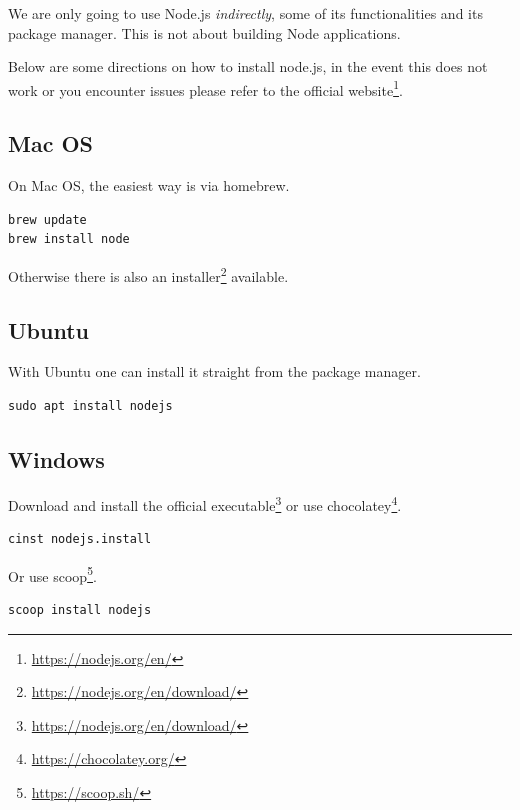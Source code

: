 \documentclass[
  10pt,
]{krantz}
\makeatletter
\renewcommand{\href}[2]{#2\footnote{\url{#1}}}
\newenvironment{kframe}{%
\medskip{}
\setlength{\fboxsep}{.8em}
 \def\at@end@of@kframe{}%
 \ifinner\ifhmode%
  \def\at@end@of@kframe{\end{minipage}}%
  \begin{minipage}{\columnwidth}%
 \fi\fi%
 \def\FrameCommand##1{\hskip\@totalleftmargin \hskip-\fboxsep
 \colorbox{shadecolor}{##1}\hskip-\fboxsep
     \hskip-\linewidth \hskip-\@totalleftmargin \hskip\columnwidth}%
 \MakeFramed {\advance\hsize-\width
   \@totalleftmargin\z@ \linewidth\hsize
   \@setminipage}}%
 {\par\unskip\endMakeFramed%
 \at@end@of@kframe}
\newenvironment{rmdblock}[1]
  {
  \begin{itemize}
  \renewcommand{\labelitemi}{
    \raisebox{-.7\height}[0pt][0pt]{
      {\setkeys{Gin}{width=3em,keepaspectratio}\texttt{[image: images/\#1]}}
    }
  }
  \setlength{\fboxsep}{1em}
  \begin{kframe}
  \item
  }
  {
  \end{kframe}
  \end{itemize}
  }
\newenvironment{rmdnote}
  {\begin{rmdblock}{note}}
  {\end{rmdblock}}
\makeatother
\begin{document}
\begin{rmdnote}
We are only going to use Node.js \emph{indirectly}, some of its
functionalities and its package manager. This is not about building Node
applications.
\end{rmdnote}

Below are some directions on how to install node.js, in the event this does not work or you encounter issues please refer to the \href{https://nodejs.org/en/}{official website}.

\hypertarget{webpack-intro-install-mac}{%
\subsection{Mac OS}\label{webpack-intro-install-mac}}

On Mac OS, the easiest way is via homebrew.

\begin{verbatim}
brew update
brew install node
\end{verbatim}

Otherwise there is also an \href{https://nodejs.org/en/download/}{installer} available.

\hypertarget{webpack-intro-install-ubuntu}{%
\subsection{Ubuntu}\label{webpack-intro-install-ubuntu}}

With Ubuntu one can install it straight from the package manager.

\begin{verbatim}
sudo apt install nodejs
\end{verbatim}

\hypertarget{webpack-intro-install-windows}{%
\subsection{Windows}\label{webpack-intro-install-windows}}

Download and install the official \href{https://nodejs.org/en/download/}{executable} or use \href{https://chocolatey.org/}{chocolatey}.

\begin{verbatim}
cinst nodejs.install
\end{verbatim}

Or use \href{https://scoop.sh/}{scoop}.

\begin{verbatim}
scoop install nodejs
\end{verbatim}
\end{document}
